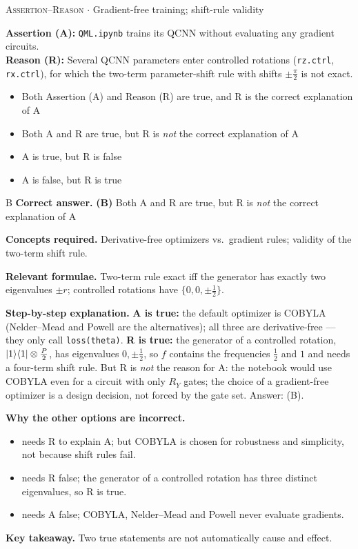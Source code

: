 \documentclass[11pt,a4paper]{article}
\newcommand{\optlabel}[1]{\textbf{(#1)}}
\newcommand{\correctlabel}[1]{\textcolor{okgreen}{\textbf{(#1)}\,\ding{51}}}
\newenvironment{qitem}[1]{\begin{list}{}{\setlength{\leftmargin}{3.3em}\setlength{\labelwidth}{3.1em}%
  \setlength{\labelsep}{0.2em}\setlength{\topsep}{3pt}\setlength{\parsep}{3pt}}\item[\textbf{Q.#1}\hfill]}{\end{list}}
\newcommand{\qsep}{\par\vspace{2pt}{\color{black!15}\hrule}\vspace{4pt}}
\newcommand{\qmeta}[2]{{\footnotesize\color{black!60}\textsc{#1} \;$\cdot$\; #2}\par}
\begin{document}
\begin{qitem}{57}
\qmeta{Assertion--Reason}{Gradient-free training; shift-rule validity}
\textbf{Assertion (A):} \texttt{QML.ipynb} trains its QCNN without evaluating any gradient circuits.\\[1mm]
\textbf{Reason (R):} Several QCNN parameters enter controlled rotations (\texttt{rz.ctrl}, \texttt{rx.ctrl}), for which the two-term
parameter-shift rule with shifts $\pm\frac\pi2$ is not exact.
\begin{itemize}[leftmargin=2.6em, labelsep=0.4em, itemsep=2pt, topsep=3pt]
\item[\optlabel{A}] Both Assertion (A) and Reason (R) are true, and R is the correct explanation of A
\item[\correctlabel{B}] Both A and R are true, but R is \emph{not} the correct explanation of A
\item[\optlabel{C}] A is true, but R is false
\item[\optlabel{D}] A is false, but R is true
\end{itemize}
\end{qitem}
\begin{solbox}{B}
\textbf{\color{brand}Correct answer.} \textcolor{okgreen}{\textbf{(B)}} Both A and R are true, but R is \emph{not} the correct explanation of A

\textbf{\color{brand}Concepts required.} Derivative-free optimizers vs.\ gradient rules; validity of the two-term shift rule.

\textbf{\color{brand}Relevant formulae.} Two-term rule exact iff the generator has exactly two eigenvalues $\pm r$; controlled rotations have $\{0, 0, \pm\frac12\}$.

\textbf{\color{brand}Step-by-step explanation.} \textbf{A is true:} the default optimizer is COBYLA (Nelder--Mead and Powell are the alternatives); all three are
derivative-free --- they only call \texttt{loss(theta)}.
\textbf{R is true:} the generator of a controlled rotation, $\ket1\!\bra1\otimes\frac P2$, has eigenvalues $0, \pm\frac12$, so $f$ contains the
frequencies $\frac12$ and $1$ and needs a four-term shift rule.
But R is \emph{not} the reason for A: the notebook would use COBYLA even for a circuit with only $R_Y$ gates; the choice of a
gradient-free optimizer is a design decision, not forced by the gate set. Answer: (B).

\textbf{\color{brand}Why the other options are incorrect.}
\begin{itemize}[leftmargin=2.4em, itemsep=1pt, topsep=2pt]
\item[\textbf{(A)}] needs R to explain A; but COBYLA is chosen for robustness and simplicity, not because shift rules fail.
\item[\textbf{(C)}] needs R false; the generator of a controlled rotation has three distinct eigenvalues, so R is true.
\item[\textbf{(D)}] needs A false; COBYLA, Nelder--Mead and Powell never evaluate gradients.
\end{itemize}
\textbf{\color{brand}Key takeaway.} Two true statements are not automatically cause and effect.
\end{solbox}
\qsep
\end{document}
